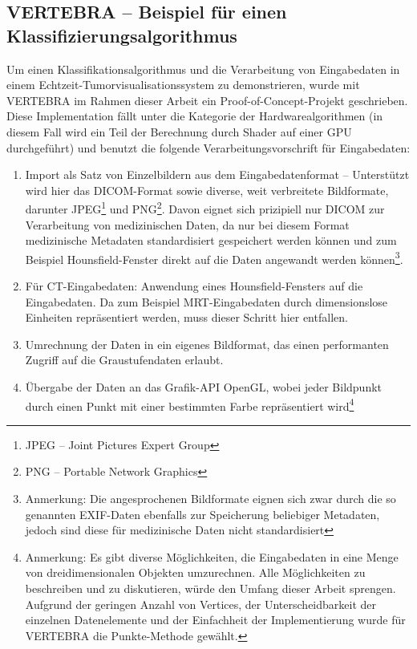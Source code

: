 \documentclass[ngerman,pdftex,paper=A4,DIV=calc,titlepage,12pt]{scrartcl}
\newtheorem[L]{boxedDefinition}{Definition}
\begin{document}
\subsection{VERTEBRA -- Beispiel für einen Klassifizierungsalgorithmus}\label{ssec:algoexample}
Um einen Klassifikationsalgorithmus und die Verarbeitung von Eingabedaten in einem Echtzeit-Tumorvisualisationssystem zu demonstrieren, wurde mit VERTEBRA im Rahmen dieser Arbeit ein Proof-of-Concept-Projekt geschrieben. Diese Implementation fällt unter die Kategorie der Hardwarealgorithmen (in diesem Fall wird ein Teil der Berechnung durch Shader auf einer GPU durchgeführt) und benutzt die folgende Verarbeitungsvorschrift für Eingabedaten:
\begin{enumerate}
 \item Import als Satz von Einzelbildern aus dem Eingabedatenformat -- Unterstützt wird hier das DICOM-Format sowie diverse, weit verbreitete Bildformate, darunter JPEG\footnote{JPEG -- Joint Pictures Expert Group} und PNG\footnote{PNG -- Portable Network Graphics}. Davon eignet sich prizipiell nur DICOM zur Verarbeitung von medizinischen Daten, da nur bei diesem Format medizinische Metadaten standardisiert gespeichert werden können und zum Beispiel Hounsfield-Fenster direkt auf die Daten angewandt werden können\footnote{Anmerkung: Die angesprochenen Bildformate eignen sich zwar durch die so genannten EXIF-Daten ebenfalls zur Speicherung beliebiger Metadaten, jedoch sind diese für medizinische Daten nicht standardisiert}.
 \item Für CT-Eingabedaten: Anwendung eines Hounsfield-Fensters auf die Eingabedaten. Da zum Beispiel MRT-Eingabedaten durch dimensionslose Einheiten repräsentiert werden, muss dieser Schritt hier entfallen.
 \item Umrechnung der Daten in ein eigenes Bildformat, das einen performanten Zugriff auf die Graustufendaten erlaubt.
 \item Übergabe der Daten an das Grafik-API OpenGL, wobei jeder Bildpunkt durch einen Punkt mit einer bestimmten Farbe repräsentiert wird\footnote{Anmerkung: Es gibt diverse Möglichkeiten, die Eingabedaten in eine Menge von dreidimensionalen Objekten umzurechnen. Alle Möglichkeiten zu beschreiben und zu diskutieren, würde den Umfang dieser Arbeit sprengen. Aufgrund der geringen Anzahl von Vertices, der Unterscheidbarkeit der einzelnen Datenelemente und der Einfachheit der Implementierung wurde für VERTEBRA die Punkte-Methode gewählt.}

\end{enumerate}
\end{document}
